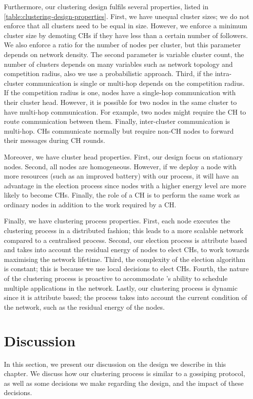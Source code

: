 Furthermore, our clustering design fulfils several properties, listed in \cref{table:clustering-design-properties}. First, we have unequal cluster sizes; we do not enforce that all clusters need to be equal in size. However, we enforce a minimum cluster size by demoting CHs if they have less than a certain number of followers. We also enforce a ratio for the number of nodes per cluster, but this parameter depends on network density. The second parameter is variable cluster count, the number of clusters depends on many variables such as network topology and competition radius, also we use a probabilistic approach. Third, if the intra-cluster communication is single or multi-hop depends on the competition radius. If the competition radius is one, nodes have a single-hop communication with their cluster head. However, it is possible for two nodes in the same cluster to have multi-hop communication. For example, two nodes might require the CH to route communication between them. Finally, inter-cluster communication is multi-hop. CHs communicate normally but require non-CH nodes to forward their messages during CH rounds.

Moreover, we have cluster head properties. First, our design focus on stationary nodes. Second, all nodes are homogeneous. However, if we deploy a node with more resources (such as an improved battery) with our process, it will have an advantage in the election process since nodes with a higher energy level are more likely to become CHs. Finally, the role of a CH is to perform the same work as ordinary nodes in addition to the work required by a CH.

Finally, we have clustering process properties. First, each node executes the clustering process in a distributed fashion; this leads to a more scalable network compared to a centralised process. Second, our election process is attribute based and takes into account the residual energy of nodes to elect CHs, to work towards maximising the network lifetime. Third, the complexity of the election algorithm is constant; this is because we use local decisions to elect CHs. Fourth, the nature of the clustering process is proactive to accommodate \atwo{}'s ability to schedule multiple applications in the network. Lastly, our clustering process is dynamic since it is attribute based; the process takes into account the current condition of the network, such as the residual energy of the nodes.


\section{Discussion}
\begin{newtext}
In this section, we present our discussion on the design we describe in this chapter. We discuss how our clustering process is similar to a gossiping protocol, as well as some decisions we make regarding the design, and the impact of these decisions.
\end{newtext}
